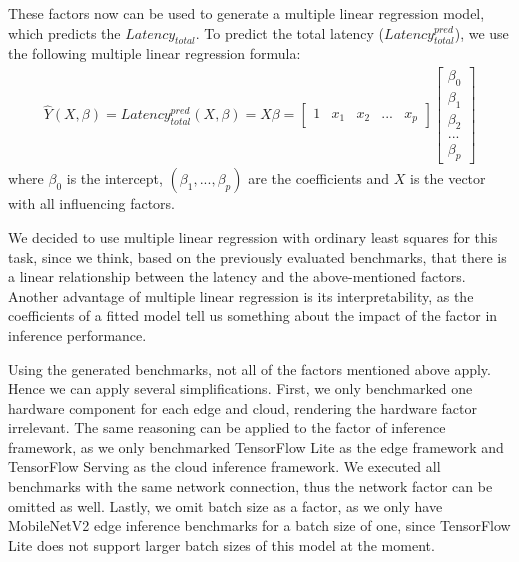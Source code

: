 These factors now can be used to generate a multiple linear regression model, which predicts the $Latency_{total}$.
To predict the total latency ($Latency_{total}^{pred}$), we use the following multiple linear regression formula:
\begin{equation} \label{eq:regression}
\begin{gathered}
\hat{Y}(X,\beta) = Latency_{total}^{pred}(X,\beta) = X \beta = \begin{bmatrix} 1 &x_{1} & x_{2}& ...& x_{p} \end{bmatrix} \begin{bmatrix}
           \beta_{0} \\
           \beta_{1} \\
           \beta_{2} \\
           ... \\
           \beta_{p}
         \end{bmatrix} 
\end{gathered}
\end{equation}
where $\beta_0$ is the intercept, $(\beta_1,...,\beta_p)$ are the coefficients and $X$ is the vector with all influencing factors.

We decided to use multiple linear regression with ordinary least squares for this task, since we think, based on the previously evaluated benchmarks, that there is a linear relationship between the latency and the above-mentioned factors.
Another advantage of multiple linear regression is its interpretability, as the coefficients of a fitted model tell us something about the impact of the factor in inference performance.

Using the generated benchmarks, not all of the factors mentioned above apply. Hence we can apply several simplifications.
First, we only benchmarked one hardware component for each edge and cloud, rendering the hardware factor irrelevant.
The same reasoning can be applied to the factor of inference framework, as we only benchmarked TensorFlow Lite as the edge framework and TensorFlow Serving as the cloud inference framework.
We executed all benchmarks with the same network connection, thus the network factor can be omitted as well.
Lastly, we omit batch size as a factor, as we only have MobileNetV2 edge inference benchmarks for a batch size of one, since TensorFlow Lite does not support larger batch sizes of this model at the moment.

